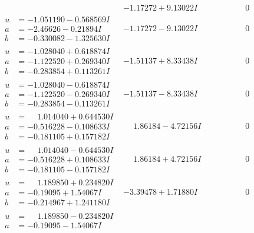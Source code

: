 \documentclass[1p]{elsarticle_modified}
\theoremstyle{definition}
\begin{document}
$$\begin{array}{c|c|c}
 & -1.17272 + 9.13022 I & \phantom{-0.000000 } 0 \\ \hline\begin{aligned}
u &= -1.051190 - 0.568569 I \\
a &= -2.46626 - 0.21894 I \\
b &= -0.330082 - 1.325630 I\end{aligned}
 & -1.17272 - 9.13022 I & \phantom{-0.000000 } 0 \\ \hline\begin{aligned}
u &= -1.028040 + 0.618874 I \\
a &= -1.122520 + 0.269340 I \\
b &= -0.283854 + 0.113261 I\end{aligned}
 & -1.51137 + 8.33438 I & \phantom{-0.000000 } 0 \\ \hline\begin{aligned}
u &= -1.028040 - 0.618874 I \\
a &= -1.122520 - 0.269340 I \\
b &= -0.283854 - 0.113261 I\end{aligned}
 & -1.51137 - 8.33438 I & \phantom{-0.000000 } 0 \\ \hline\begin{aligned}
u &= \phantom{-}1.014040 + 0.644530 I \\
a &= -0.516228 - 0.108633 I \\
b &= -0.181105 + 0.157182 I\end{aligned}
 & \phantom{-}1.86184 - 4.72156 I & \phantom{-0.000000 } 0 \\ \hline\begin{aligned}
u &= \phantom{-}1.014040 - 0.644530 I \\
a &= -0.516228 + 0.108633 I \\
b &= -0.181105 - 0.157182 I\end{aligned}
 & \phantom{-}1.86184 + 4.72156 I & \phantom{-0.000000 } 0 \\ \hline\begin{aligned}
u &= \phantom{-}1.189850 + 0.234820 I \\
a &= -0.19095 + 1.54067 I \\
b &= -0.214967 + 1.241180 I\end{aligned}
 & -3.39478 + 1.71880 I & \phantom{-0.000000 } 0 \\ \hline\begin{aligned}
u &= \phantom{-}1.189850 - 0.234820 I \\
a &= -0.19095 - 1.54067 I \\

\end{aligned}
\end{array}$$
\end{document}
